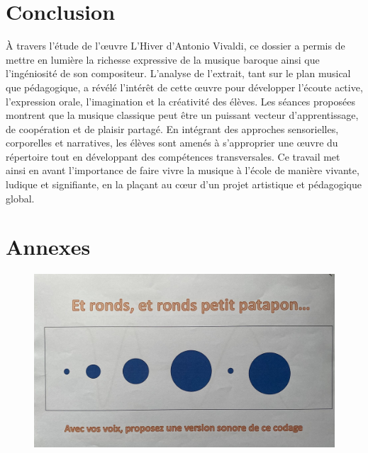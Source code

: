 \documentclass[12pt]{article}
\begin{document}

\section{Conclusion}

À travers l’étude de l’œuvre L’Hiver d’Antonio Vivaldi, ce dossier a permis de mettre en lumière la richesse expressive de la musique baroque ainsi que l’ingéniosité de son compositeur. L’analyse de l’extrait, tant sur le plan musical que pédagogique, a révélé l’intérêt de cette œuvre pour développer l’écoute active, l’expression orale, l’imagination et la créativité des élèves.
Les séances proposées montrent que la musique classique peut être un puissant vecteur d’apprentissage, de coopération et de plaisir partagé. En intégrant des approches sensorielles, corporelles et narratives, les élèves sont amenés à s’approprier une œuvre du répertoire tout en développant des compétences transversales.
Ce travail met ainsi en avant l’importance de faire vivre la musique à l’école de manière vivante, ludique et signifiante, en la plaçant au cœur d’un projet artistique et pédagogique global.


\newpage 

\section*{Annexes}

\begin{figure}[h!]
    \centering
    \includegraphics[scale=0.15]{./images/musique_1.png}
\end{figure}
\end{document}
